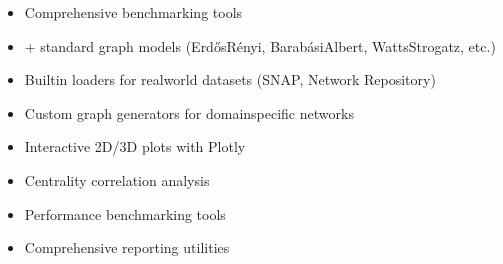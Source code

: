 \documentclass[letterpaper,10pt,english]{sphinxmanual}
\begin{document}
\begin{description}
\begin{itemize}
\item {} 
\sphinxAtStartPar
Comprehensive benchmarking tools

\end{itemize}

\begin{itemize}
\item {} 
+ standard graph models (Erdős\textendash{}Rényi, Barabási\textendash{}Albert, Watts\textendash{}Strogatz, etc.)

\item {} 
\sphinxAtStartPar
Built\sphinxhyphen{}in loaders for real\sphinxhyphen{}world datasets (SNAP, Network Repository)

\item {} 
\sphinxAtStartPar
Custom graph generators for domain\sphinxhyphen{}specific networks

\end{itemize}

\begin{itemize}
\item {} 
\sphinxAtStartPar
Interactive 2D/3D plots with Plotly

\item {} 
\sphinxAtStartPar
Centrality correlation analysis

\item {} 
\sphinxAtStartPar
Performance benchmarking tools

\item {} 
\sphinxAtStartPar
Comprehensive reporting utilities

\end{itemize}

\end{description}
\end{document}
